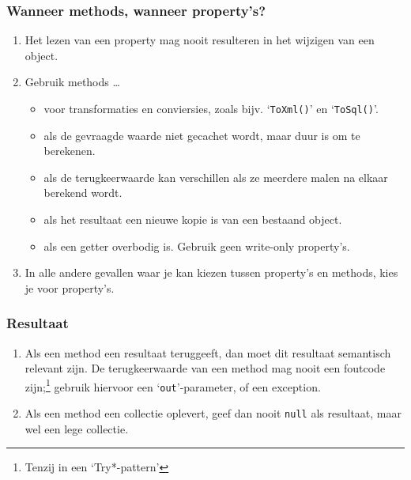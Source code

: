 \documentclass[a4paper,11pt]{article}
\begin{document}
\subsubsection{Wanneer methods, wanneer property's?}
\begin{enumerate}[resume]
\item Het lezen van een property mag nooit resulteren in het wijzigen van
een object.
\item Gebruik methods \ldots
\begin{itemize}
\item voor transformaties en conviersies, zoals bijv. `\lstinline !ToXml()!' en `\lstinline !ToSql()!'.
\item als de gevraagde waarde niet gecachet wordt, maar duur is om te berekenen.
\item als de terugkeerwaarde kan verschillen als ze meerdere malen na
elkaar berekend wordt.
\item als het resultaat een nieuwe kopie is van een bestaand object.
\item als een getter overbodig is.  Gebruik geen write-only property's.
\end{itemize}
\item In alle andere gevallen waar je kan kiezen tussen property's en methods, kies je voor property's.
\end{enumerate}

\subsubsection{Resultaat}
\begin{enumerate}[resume]
\item Als een method een resultaat teruggeeft, dan moet dit resultaat
semantisch relevant zijn.  De terugkeerwaarde van een method mag nooit een
foutcode zijn;\footnote{Tenzij in een `Try*-pattern'} gebruik hiervoor een `\lstinline !out!'-parameter, of een
exception.
\item Als een method een collectie oplevert, geef dan nooit 
\lstinline !null! als resultaat, maar wel een lege
collectie.
\end{enumerate}
\end{document}
